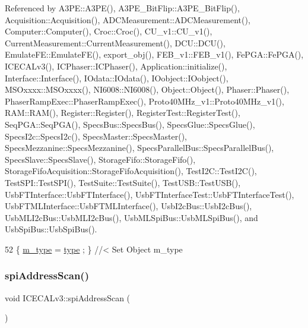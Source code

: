 Referenced by A3\+P\+E\+::\+A3\+P\+E(), A3\+P\+E\+\_\+\+Bit\+Flip\+::\+A3\+P\+E\+\_\+\+Bit\+Flip(), Acquisition\+::\+Acquisition(), A\+D\+C\+Measurement\+::\+A\+D\+C\+Measurement(), Computer\+::\+Computer(), Croc\+::\+Croc(), C\+U\+\_\+v1\+::\+C\+U\+\_\+v1(), Current\+Measurement\+::\+Current\+Measurement(), D\+C\+U\+::\+D\+C\+U(), Emulate\+F\+E\+::\+Emulate\+F\+E(), export\+\_\+obj(), F\+E\+B\+\_\+v1\+::\+F\+E\+B\+\_\+v1(), Fe\+P\+G\+A\+::\+Fe\+P\+G\+A(), I\+C\+E\+C\+A\+Lv3(), I\+C\+Phaser\+::\+I\+C\+Phaser(), Application\+::initialize(), Interface\+::\+Interface(), I\+Odata\+::\+I\+Odata(), I\+Oobject\+::\+I\+Oobject(), M\+S\+Oxxxx\+::\+M\+S\+Oxxxx(), N\+I6008\+::\+N\+I6008(), Object\+::\+Object(), Phaser\+::\+Phaser(), Phaser\+Ramp\+Exec\+::\+Phaser\+Ramp\+Exec(), Proto40\+M\+Hz\+\_\+v1\+::\+Proto40\+M\+Hz\+\_\+v1(), R\+A\+M\+::\+R\+A\+M(), Register\+::\+Register(), Register\+Test\+::\+Register\+Test(), Seq\+P\+G\+A\+::\+Seq\+P\+G\+A(), Specs\+Bus\+::\+Specs\+Bus(), Specs\+Glue\+::\+Specs\+Glue(), Specs\+I2c\+::\+Specs\+I2c(), Specs\+Master\+::\+Specs\+Master(), Specs\+Mezzanine\+::\+Specs\+Mezzanine(), Specs\+Parallel\+Bus\+::\+Specs\+Parallel\+Bus(), Specs\+Slave\+::\+Specs\+Slave(), Storage\+Fifo\+::\+Storage\+Fifo(), Storage\+Fifo\+Acquisition\+::\+Storage\+Fifo\+Acquisition(), Test\+I2\+C\+::\+Test\+I2\+C(), Test\+S\+P\+I\+::\+Test\+S\+P\+I(), Test\+Suite\+::\+Test\+Suite(), Test\+U\+S\+B\+::\+Test\+U\+S\+B(), Usb\+F\+T\+Interface\+::\+Usb\+F\+T\+Interface(), Usb\+F\+T\+Interface\+Test\+::\+Usb\+F\+T\+Interface\+Test(), Usb\+F\+T\+M\+L\+Interface\+::\+Usb\+F\+T\+M\+L\+Interface(), Usb\+I2c\+Bus\+::\+Usb\+I2c\+Bus(), Usb\+M\+L\+I2c\+Bus\+::\+Usb\+M\+L\+I2c\+Bus(), Usb\+M\+L\+Spi\+Bus\+::\+Usb\+M\+L\+Spi\+Bus(), and Usb\+Spi\+Bus\+::\+Usb\+Spi\+Bus().


\begin{DoxyCode}
52 \{ \hyperlink{classObject_a457a600fe8c00eb1034374f75110a78c}{m\_type}  = \hyperlink{classObject_a84f99f70f144a83e1582d1d0f84e4e62}{type}  ; \} \textcolor{comment}{//< Set Object m\_type}
\end{DoxyCode}
\mbox{\label{classICECALv3_acbf1a7a8510d7e02280bacc58badf4f4}} 
\subsubsection{\texorpdfstring{spi\+Address\+Scan()}{spiAddressScan()}}
{\footnotesize\ttfamily void I\+C\+E\+C\+A\+Lv3\+::spi\+Address\+Scan (\begin{DoxyParamCaption}{ }\end{DoxyParamCaption})}



